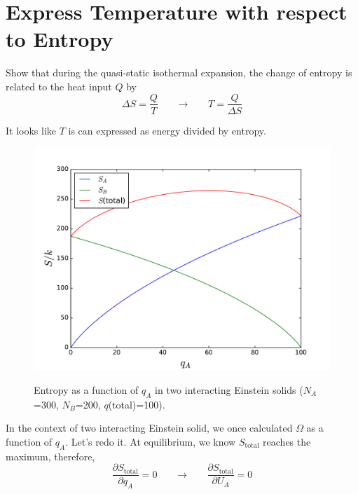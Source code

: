 
\section{Express Temperature with respect to Entropy}
Show that during the quasi-static isothermal expansion, the change of entropy is related to the heat input $Q$ by
\begin{equation} \label{entropy} 
\Delta{S}=\frac{Q}{T}     ~~~~~~~~ \rightarrow~~~~~~~~  T = \frac{Q}{\Delta{S}}
\end{equation}

It looks like $T$ is can expressed as energy divided by entropy.

\begin{figure}[h]
\centering
{\includegraphics[width=12cm]{imgs/Einstein3}}
\caption{\label{dS} Entropy as a function of $q_A$ in two interacting Einstein solids ($N_A$=300, $N_B$=200, $q$(total)=100). }
\end{figure}


In the context of two interacting Einstein solid, we once calculated $\Omega$ as a function of $q_A$. Let's redo it.
At equilibrium, we know $S_\text{total}$ reaches the maximum, therefore,
\begin{equation} \label{entropy} 
\frac {\partial{S_\text{total}}} {\partial{q_A}}=0     ~~~~~~~~ \rightarrow~~~~~~~~  \frac {\partial{S_\text{total}}} {\partial{U_A}}=0
\end{equation}

